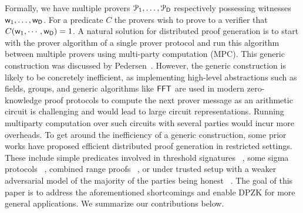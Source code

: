 Formally, we have multiple provers $\mathcal{P}_1, \ldots, \mathcal{P}_{\mathsf{D}}$
respectively possessing witnesses $\mathsf{w}_1, \ldots, \mathsf{w}_{\mathsf{D}}$. For a predicate $C$ the provers wish to prove to a verifier that $C(\mathsf{w}_1,\cdots,\mathsf{w}_{\mathsf{D}}) = 1$.  
A natural solution for distributed
proof generation is to start with the prover algorithm of a single prover
protocol and run this algorithm between multiple provers using multi-party computation (MPC). This generic construction was discussed by Pedersen~\cite{Ped92}. 
 However, the generic construction is likely to be concretely
inefficient, as implementing high-level abstractions such as fields, groups, and generic algorithms like $\mathsf{FFT}$ are used in modern zero-knowledge proof protocols to compute the next prover message as an
arithmetic circuit is challenging and would lead to large circuit
representations. Running multiparty computation over such circuits with several
parties would incur more overheads.
To get around the inefficiency of a generic construction, some prior works have proposed efficient distributed proof generation in restricted settings. These include simple predicates involved in threshold signatures ~\cite{DDS}, some sigma protocols ~\cite{EfficientTZ}, combined range proofs ~\cite{bulletproofs},
or under trusted setup with a weaker adversarial model of the majority of the parties
being honest ~\cite{trinocchio}. The goal of this paper is to address the aforementioned shortcomings and enable DPZK for more general applications. We summarize our contributions below.
